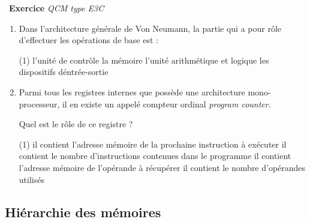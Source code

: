\documentclass[a4paper, french, 11pt]{article}  %
\newcounter{exercice}
\newenvironment{exercice}[1]
{\par \medskip   \addtocounter{exercice}{1} \noindent  
\begin{bclogo}[arrondi =0.1,   noborder = true, logo=\bccrayon, marge=4]{~\textbf{Exercice} \textbf{\theexercice} {\itshape #1} }  \par}
{
\end{bclogo}
 \par \bigskip }
\newcounter{prog}
\begin{document}
\vspace*{-20pt}

\begin{exercice}{QCM type E3C}

\begin{enumerate}

\item Dans l'architecture générale de Von Neumann, la partie qui a pour rôle
d'effectuer les opérations de base est : 

\begin{tasks}[style=multiplechoice-alph](1)
\task  l'unité de contrôle
\task la mémoire
\task l'unité arithmétique et logique
\task les dispositifs d\'entrée-sortie
\end{tasks}

\item Parmi tous les registres internes que possède une architecture
mono-processeur, il en existe un appelé compteur ordinal \textit{program
counter}.

Quel est le rôle de ce registre ?


\begin{tasks}[style=multiplechoice-alph](1)
\task  il contient l'adresse mémoire de la prochaine instruction à exécuter
\task il contient le nombre d'instructions contenues dans le programme
\task il contient l'adresse mémoire de l'opérande à récupérer
\task il contient le nombre d'opérandes utilisés
\end{tasks}


\end{enumerate}



\end{exercice}

\subsection{Hiérarchie des mémoires}
\end{document}
